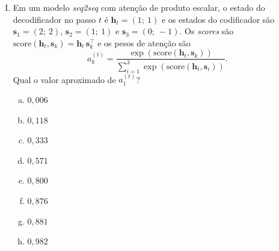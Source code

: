 \documentclass{dlproblemset}
\begin{document}
\begin{enumerate}[I)]
\begin{enumerate}[a)]
    \item 1-(ii); -(i); -(iv); -(iii)
    \item 1-(iii); -(i); -(ii); -(iv)
    \item 1-(ii); -(i); -(iii); -(iv)
    \item 1-(i); -(ii); -(iii); -(iv)
    \item 1-(ii); -(iv); -(iii); -(i)
    \item 1-(i); -(ii); -(iv); -(iii)
    \item 1-(iii); -(iv); -(ii); -(i)
    \item 1-(iv); -(i); -(iii); -(ii)
\end{enumerate}

\item Em um modelo \textit{seq2seq} com atenção de produto escalar, o estado do decodificador no passo $t$ é $\mathbf{h}_t = (1;\ 1)$ e os estados do codificador são $\mathbf{s}_1 = (2;\ 2)$, $\mathbf{s}_2 = (1;\ 1)$ e $\mathbf{s}_3 = (0;\ -1)$. Os \textit{scores} são $\mathrm{score}(\mathbf{h}_t, \mathbf{s}_k) = \mathbf{h}_t\,\mathbf{s}_k^{\top}$ e os pesos de atenção são
\[
a_k^{(t)} = \frac{\exp(\mathrm{score}(\mathbf{h}_t, \mathbf{s}_k))}{\sum_{i=1}^{3}\exp(\mathrm{score}(\mathbf{h}_t, \mathbf{s}_i))}.
\]
Qual o valor aproximado de $a_1^{(t)}$?

\begin{enumerate}[a)]
    \item $0{,}006$
    \item $0{,}118$
    \item $0{,}333$
    \item $0{,}571$
    \item $0{,}800$
    \item $0{,}876$
    \item $0{,}881$
    \item $0{,}982$
\end{enumerate}

\end{enumerate}
\end{document}
